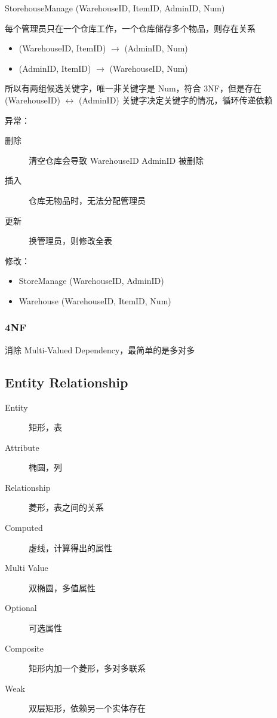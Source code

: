\documentclass[11pt,journal,compsoc]{IEEEtran}
\begin{document}
StorehouseManage (WarehouseID, ItemID, AdminID, Num)

每个管理员只在一个仓库工作，一个仓库储存多个物品，则存在关系

\begin{itemize}
    \item (WarehouseID, ItemID) $\to$ (AdminID, Num)

    \item (AdminID, ItemID) $\to$ (WarehouseID, Num)
\end{itemize}

所以有两组候选关键字，唯一非关键字是 Num，符合 3NF，但是存在 (WarehouseID) $\leftrightarrow$ (AdminID) 关键字决定关键字的情况，循环传递依赖

异常：

\begin{description}
    \item[删除] 清空仓库会导致 WarehouseID AdminID 被删除

    \item[插入] 仓库无物品时，无法分配管理员

    \item[更新] 换管理员，则修改全表
\end{description}

修改：

\begin{itemize}
    \item StoreManage (WarehouseID, AdminID)

    \item Warehouse (WarehouseID, ItemID, Num)
\end{itemize}


\subsubsection{4NF}

消除 Multi-Valued Dependency，最简单的是多对多


\subsection{Entity Relationship}

\begin{description}
    \item[Entity] 矩形，表
    \item[Attribute] 椭圆，列
    \item[Relationship] 菱形，表之间的关系
    \item[Computed] 虚线，计算得出的属性
    \item[Multi Value] 双椭圆，多值属性
    \item[Optional] 可选属性
    \item[Composite] 矩形内加一个菱形，多对多联系
    \item[Weak] 双层矩形，依赖另一个实体存在
\end{description}
\end{document}
